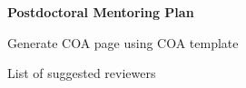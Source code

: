 
\newpage
{}
\renewcommand{\thepage}{D--\arabic{page}}


\newpage
{}
\renewcommand{\thepage}{E--\arabic{page}}



\newpage
{}
\renewcommand{\thepage} {F--\arabic{page}}



\newpage
{}
\renewcommand{\thepage} {G--\arabic{page}}


\newpage
{}
\renewcommand{\thepage} {H--\arabic{page}}



\newpage
{}
\renewcommand{\thepage} {I--\arabic{page}}


\newpage
{}
\renewcommand{\thepage} {J--\arabic{page}}

\newpage
\textbf{Postdoctoral Mentoring Plan} %




\newpage
{}
\renewcommand{\thepage} {K--\arabic{page}}
\begin{pappg}
    Generate COA page using COA template
\end{pappg}
\newpage
\begin{pappg}
    List of suggested reviewers
\end{pappg}


%
%



